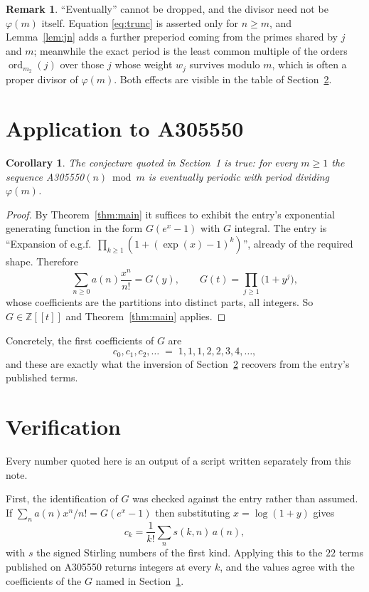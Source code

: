 \documentclass[11pt,a4paper]{article}
\theoremstyle{plain}
\newtheorem{corollary}[theorem]{Corollary}
\theoremstyle{definition}
\newtheorem{remark}[theorem]{Remark}
\newcommand{\ord}{\operatorname{ord}}
\newcommand{\Z}{\mathbb{Z}}
\begin{document}
\begin{remark}
``Eventually'' cannot be dropped, and the divisor need not be $\varphi(m)$ itself.
Equation \eqref{eq:trunc} is asserted only for $n\ge m$, and Lemma~\ref{lem:jn} adds a
further preperiod coming from the primes shared by $j$ and $m$; meanwhile the exact period
is the least common multiple of the orders $\ord_{m_{2}}(j)$ over those $j$ whose weight
$w_{j}$ survives modulo $m$, which is often a proper divisor of $\varphi(m)$. Both effects
are visible in the table of Section~\ref{sec:ver}.
\end{remark}

\section{Application to A305550}\label{sec:apply}

\begin{corollary}\label{cor:this}
The conjecture quoted in Section~1 is true: for every $m\ge1$ the sequence
A305550$(n) \bmod m$ is eventually periodic with period dividing $\varphi(m)$.
\end{corollary}

\begin{proof}
By Theorem~\ref{thm:main} it suffices to exhibit the entry's exponential generating
function in the form $G(e^{x}-1)$ with $G$ integral. The entry is ``Expansion of e.g.f.\ $\prod_{k\ge1}(1+(\exp(x)-1)^{k})$'', already of the required shape. Therefore
\[
\sum_{n\ge0}a(n)\frac{x^{n}}{n!}=G(y),\qquad G(t)=\prod_{j\ge1}\bigl(1+y^{j}\bigr) ,
\]
whose coefficients are the partitions into distinct parts, all integers. So $G\in\Z[[t]]$ and
Theorem~\ref{thm:main} applies.
\end{proof}

Concretely, the first coefficients of $G$ are
\[
c_{0},c_{1},c_{2},\dots \;=\; 1, 1, 1, 2, 2, 3, 4, \dots ,
\]
and these are exactly what the inversion of Section~\ref{sec:ver} recovers from the
entry's published terms.

\section{Verification}\label{sec:ver}

Every number quoted here is an output of a script written separately from this note.

First, the identification of $G$ was checked against the entry rather than assumed. If
$\sum_{n}a(n)x^{n}/n!=G(e^{x}-1)$ then substituting $x=\log(1+y)$ gives
\[
c_{k}=\frac{1}{k!}\sum_{n}s(k,n)\,a(n),
\]
with $s$ the signed Stirling numbers of the first kind. Applying this to the
$22$ terms published on A305550 returns integers at every $k$, and the values
agree with the coefficients of the $G$ named in Section~\ref{sec:apply}.
\end{document}
